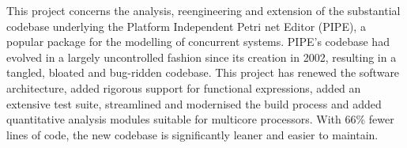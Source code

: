 This project concerns the analysis, reengineering and extension of the
substantial codebase underlying the Platform Independent Petri net
Editor (PIPE), a popular package for the modelling of concurrent
systems. PIPE's codebase had evolved in a largely uncontrolled fashion
since its creation in 2002, resulting in a tangled, bloated and
bug-ridden codebase. This project has renewed the software
architecture, added rigorous support for functional expressions, added
an extensive test suite, streamlined and modernised the build process
and added quantitative analysis modules suitable for multicore
processors.  With 66\% fewer lines of code, the new codebase is
significantly leaner and easier to maintain.